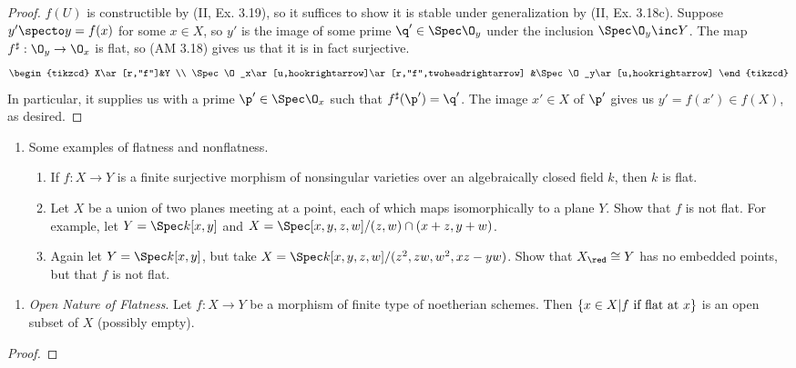 \documentclass[12pt]{amsart}
\begin{document}
\begin{proof}
  $f(U)$ is constructible by (II, Ex. 3.19), so it suffices to show it is stable under generalization by (II, Ex. 3.18c).
  Suppose $y'\specto y=f(x)$ for some $x\in X$, so $y'$ is the image of some prime $\q'\in\Spec \O_y$ under the inclusion $\Spec \O_y\inc Y$.
  The map $f^\sharp:\O_y\to \O_x$ is flat, so (AM 3.18) gives us that it is in fact surjective.
  \[
    \begin{tikzcd}
      X\ar[r,"f"]&Y \\
      \Spec\O_x\ar[u,hookrightarrow]\ar[r,"f",twoheadrightarrow] &\Spec\O_y\ar[u,hookrightarrow]
    \end{tikzcd}
  \] 
  In particular, it supplies us with a prime $\p'\in \Spec\O_x$ such that $f^\sharp(\p')=\q'$.
  The image $x'\in X$ of $\p'$ gives us $y'=f(x')\in f(X)$, as desired.
\end{proof}

\begin{enumerate}
  \item[9.3.] {
      Some examples of flatness and nonflatness.
      \begin{enumerate}
        \item If $f:X\to Y$ is a finite surjective morphism of nonsingular varieties over an algebraically closed field $k$, then $k$ is flat.
        \item Let $X$ be a union of two planes meeting at a point, each of which maps isomorphically to a plane $Y$.
          Show that $f$ is not flat.
          For example, let $Y=\Spec k[x,y]$ and $X=\Spec[x,y,z,w]/(z,w)\cap (x+z,y+w)$.
        \item Again let $Y=\Spec k[x,y]$, but take $X=\Spec k[x,y,z,w]/(z^2, zw, w^2, xz-yw)$.
          Show that $X_\red\cong Y$ has no embedded points, but that $f$ is not flat.
      \end{enumerate}
    }
\end{enumerate}

\begin{enumerate}
  \item[9.4.] {
      \emph{Open Nature of Flatness}.
      Let $f:X\to Y$ be a morphism of finite type of noetherian schemes.
      Then $\{x\in X|\textup{$f$ if flat at $x$}\}$ is an open subset of $X$ (possibly empty).
    }
\end{enumerate}

\begin{proof}
  
\end{proof}
\end{document}
